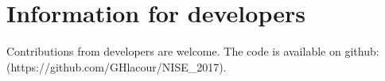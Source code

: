 \chapter{Information for developers}
Contributions from developers are welcome. The code is available on github:\\ (https://github.com/GHlacour/NISE\_2017).